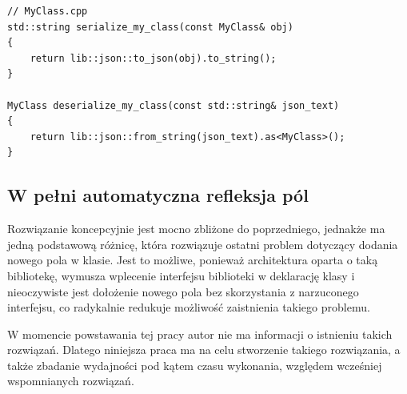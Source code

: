 \documentclass[12pt]{article}
\newcommand{\n}{\newline}
\begin{document}
{{{\begin{lstlisting}[frame=single]
// MyClass.cpp
std::string serialize_my_class(const MyClass& obj)
{
	return lib::json::to_json(obj).to_string();
}

MyClass deserialize_my_class(const std::string& json_text)
{
	return lib::json::from_string(json_text).as<MyClass>();
}
				\end{lstlisting}
			}
		}

		{
			\subsection{W pełni automatyczna refleksja pól}

			Rozwiązanie koncepcyjnie jest mocno zbliżone do poprzedniego, jednakże ma jedną podstawową różnicę, która rozwiązuje ostatni
			problem dotyczący dodania nowego pola w klasie. Jest to możliwe, ponieważ architektura oparta o taką bibliotekę, wymusza wplecenie
			interfejsu biblioteki w deklarację klasy i nieoczywiste jest dołożenie nowego pola bez skorzystania z narzuconego interfejsu, co
			radykalnie redukuje możliwość zaistnienia takiego problemu.\n

			W momencie powstawania tej pracy autor nie ma informacji o istnieniu takich rozwiązań. Dlatego niniejsza praca ma na celu
			stworzenie takiego rozwiązania, a także zbadanie wydajności pod kątem czasu wykonania, względem wcześniej wspomnianych rozwiązań.
		}
	}
\end{document}
